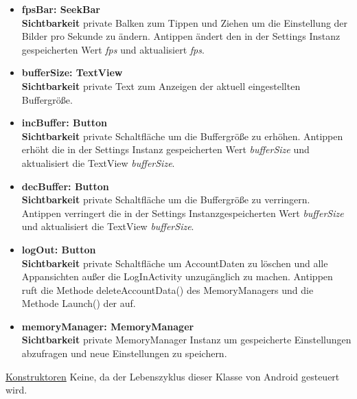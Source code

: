 \begin{itemize}
\item \textbf{fpsBar: SeekBar} \hfill\\ 
\textbf{Sichtbarkeit} private \newline
Balken zum Tippen und Ziehen um die Einstellung der  Bilder pro Sekunde zu ändern. Antippen ändert den in der Settings Instanz gespeicherten Wert \textit{fps} und aktualisiert \textit{fps}.

\item \textbf{bufferSize: TextView} \hfill\\ 
\textbf{Sichtbarkeit} private \newline
Text zum Anzeigen der aktuell eingestellten Buffergröße.

\item \textbf{incBuffer: Button} \hfill\\ 
\textbf{Sichtbarkeit} private \newline
Schaltfläche um die Buffergröße zu erhöhen. Antippen erhöht die in der Settings Instanz gespeicherten Wert \textit{bufferSize} und aktualisiert die TextView \textit{bufferSize}.

\item \textbf{decBuffer: Button} \hfill\\ 
\textbf{Sichtbarkeit} private \newline
Schaltfläche um die Buffergröße zu verringern. Antippen verringert die in der Settings Instanzgespeicherten Wert \textit{bufferSize} und aktualisiert die TextView \textit{bufferSize}.

\item \textbf{logOut: Button} \hfill\\ 
\textbf{Sichtbarkeit} private \newline
Schaltfläche um AccountDaten zu löschen und alle Appansichten außer die LogInActivity unzugänglich zu machen. Antippen ruft die Methode deleteAccountData() des MemoryManagers und die Methode Launch() der  auf.

\item \textbf{memoryManager: MemoryManager} \hfill\\ 
\textbf{Sichtbarkeit} private \newline
MemoryManager Instanz um gespeicherte Einstellungen abzufragen und neue Einstellungen zu speichern.

\end{itemize}

\underline{Konstruktoren}\newline
\indent Keine, da der Lebenszyklus dieser Klasse von Android gesteuert wird.\newline

